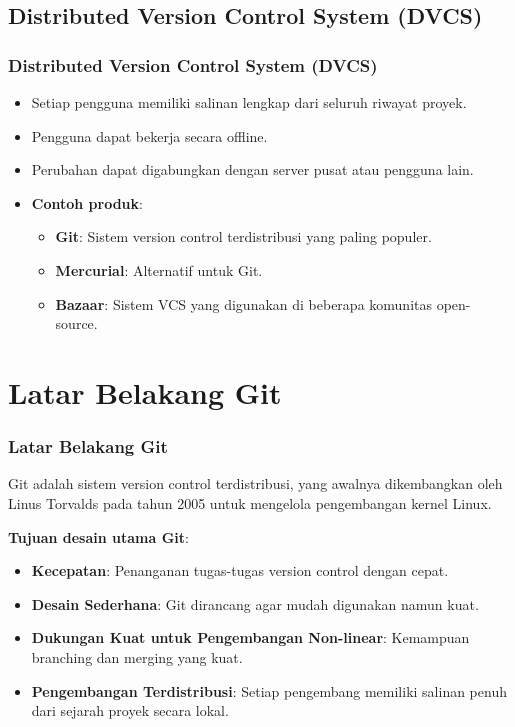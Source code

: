 \documentclass[aspectratio=169, table]{beamer}
\begin{document}
	\subsection{Distributed Version Control System (DVCS)}
	
	\begin{frame}[fragile]
		\frametitle{Distributed Version Control System (DVCS)}
		\begin{itemize}
			\item Setiap pengguna memiliki salinan lengkap dari seluruh riwayat proyek.
			\item Pengguna dapat bekerja secara offline.
			\item Perubahan dapat digabungkan dengan server pusat atau pengguna lain.
			\item \textbf{Contoh produk}:
			\begin{itemize}
				\item \textbf{Git}: Sistem version control terdistribusi yang paling populer.
				\item \textbf{Mercurial}: Alternatif untuk Git.
				\item \textbf{Bazaar}: Sistem VCS yang digunakan di beberapa komunitas open-source.
			\end{itemize}
		\end{itemize}
	\end{frame}
	
	\section{Latar Belakang Git}
	
	\begin{frame}[fragile]
		\vspace{10pt}
		\frametitle{Latar Belakang Git}
		Git adalah sistem version control terdistribusi, yang awalnya dikembangkan oleh Linus Torvalds pada tahun 2005 untuk mengelola pengembangan kernel Linux. 
		
		\textbf{Tujuan desain utama Git}:
		\begin{itemize}
			\item \textbf{Kecepatan}: Penanganan tugas-tugas version control dengan cepat.
			\item \textbf{Desain Sederhana}: Git dirancang agar mudah digunakan namun kuat.
			\item \textbf{Dukungan Kuat untuk Pengembangan Non-linear}: Kemampuan branching dan merging yang kuat.
			\item \textbf{Pengembangan Terdistribusi}: Setiap pengembang memiliki salinan penuh dari sejarah proyek secara lokal.
		\end{itemize}
	\end{frame}
	
\end{document}
